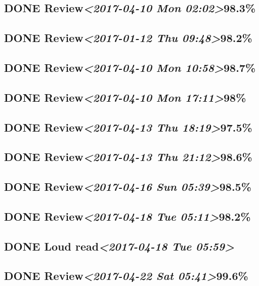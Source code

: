 \documentclass[11pt]{ctexart}
\begin{document}
\subsection{{\bfseries\sffamily DONE} Review\textit{<2017-04-10 Mon 02:02>}98.3\%}
\label{sec:orga5cbf4e}
\subsection{{\bfseries\sffamily DONE} Review\textit{<2017-01-12 Thu 09:48>}98.2\%}
\label{sec:org782d400}
\subsection{{\bfseries\sffamily DONE} Review\textit{<2017-04-10 Mon 10:58>}98.7\%}
\label{sec:org12feae1}
\subsection{{\bfseries\sffamily DONE} Review\textit{<2017-04-10 Mon 17:11>}98\%}
\label{sec:orgecff3f4}
\subsection{{\bfseries\sffamily DONE} Review\textit{<2017-04-13 Thu 18:19>}97.5\%}
\label{sec:org9926cf7}
\subsection{{\bfseries\sffamily DONE} Review\textit{<2017-04-13 Thu 21:12>}98.6\%}
\label{sec:org6af2f59}
\subsection{{\bfseries\sffamily DONE} Review\textit{<2017-04-16 Sun 05:39>}98.5\%}
\label{sec:org73ba8da}
\subsection{{\bfseries\sffamily DONE} Review\textit{<2017-04-18 Tue 05:11>}98.2\%}
\label{sec:org1b33d73}
\subsection{{\bfseries\sffamily DONE} Loud read\textit{<2017-04-18 Tue 05:59>}}
\label{sec:orgb4d43ac}
\subsection{{\bfseries\sffamily DONE} Review\textit{<2017-04-22 Sat 05:41>}99.6\%}
\label{sec:org636c033}
\end{document}
